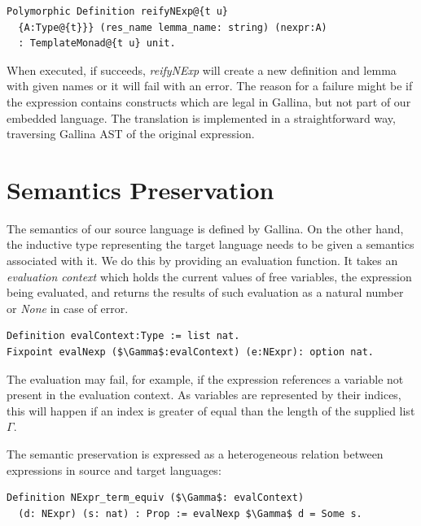 \documentclass[sigplan]{acmart}\settopmatter{printfolios=true,printccs=false,printacmref=false}
\begin{document}
\begin{lstlisting}[language=Coq, mathescape=true,
  frame=single, basicstyle=\footnotesize]
Polymorphic Definition reifyNExp@{t u}
  {A:Type@{t}}} (res_name lemma_name: string) (nexpr:A)
  : TemplateMonad@{t u} unit.
\end{lstlisting}

When executed, if succeeds, \emph{reifyNExp} will create a new
definition and lemma with given names or it will fail with an
error. The reason for a failure might be if the expression contains
constructs which are legal in Gallina, but not part of our embedded
language. The translation is implemented in a straightforward way,
traversing Gallina AST of the original expression.

\section{Semantics Preservation}

The semantics of our source language is defined by Gallina. On the
other hand, the inductive type representing the target language needs
to be given a semantics associated with it. We do this by providing an
evaluation function. It takes an \textit{evaluation context} which
holds the current values of free variables, the expression being
evaluated, and returns the results of such evaluation as a natural
number or \emph{None} in case of error.

\begin{lstlisting}[language=Coq, mathescape=true,
  frame=single, basicstyle=\footnotesize]
Definition evalContext:Type := list nat.
Fixpoint evalNexp ($\Gamma$:evalContext) (e:NExpr): option nat.
\end{lstlisting}

The evaluation may fail, for example, if the expression references a
variable not present in the evaluation context. As variables are
represented by their indices, this will happen if an index is greater
of equal than the length of the supplied list $\Gamma$.

The semantic preservation is expressed as a heterogeneous relation
between expressions in source and target languages:

\begin{lstlisting}[language=Coq, mathescape=true,
  frame=single, basicstyle=\footnotesize]
Definition NExpr_term_equiv ($\Gamma$: evalContext)
  (d: NExpr) (s: nat) : Prop := evalNexp $\Gamma$ d = Some s.
\end{lstlisting}
\end{document}
